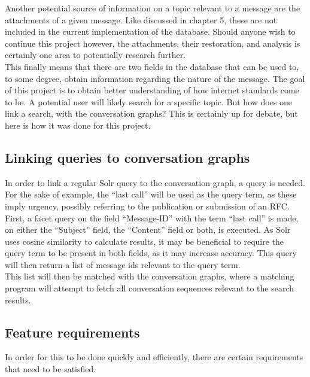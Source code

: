 \documentclass[a4paper,english]{report}
\begin{document}
Another potential source of information on a topic relevant to a message are the attachments of a given message. Like discussed in chapter 5, these are not included in the current implementation of the database. Should anyone wish to continue this project however, the attachments, their restoration, and analysis is certainly one area to potentially research further.\\

This finally means that there are two fields in the database that can be used to, to some degree, obtain information regarding the nature of the message. The goal of this project is to obtain better understanding of how internet standards come to be. A potential user will likely search for a specific topic. But how does one link a search, with the conversation graphs? This is certainly up for debate, but here is how it was done for this project.\\

\subsection{Linking queries to conversation graphs}


In order to link a regular Solr query to the conversation graph, a query is needed. For the sake of example, the “last call” will be used as the query term, as these imply urgency, possibly referring to the publication or submission of an RFC.\\

First, a facet query on the field “Message-ID”  with the term “last call” is made, on either the “Subject” field, the “Content” field or both, is executed.  As Solr uses cosine similarity to calculate results, it may be beneficial to require the query term to be present in both fields, as it may increase accuracy.
This query will then return a list of message ids relevant to the query term.\\

This list will then be matched with the conversation graphs, where a matching program will attempt to fetch all conversation sequences relevant to the search results. \\

\subsection{Feature requirements}

In order for this to be done quickly and efficiently, there are certain requirements that need to be satisfied.
\end{document}
